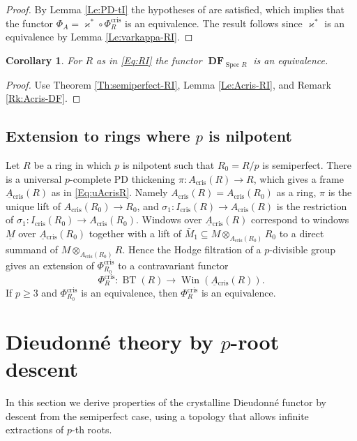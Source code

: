 \documentclass[a4paper,11pt]{article}
\theoremstyle{plain}
\newtheorem{Cor}[Lemma]{Corollary}
\theoremstyle{definition}
\theoremstyle{remark}
\theoremstyle{definition}
\numberwithin{Lemma}{section}
\numberwithin{Subpoint}{Lemma}
\numberwithin{equation}{section}
\newcommand{\DD}{{\mathbb{D}}}
\newcommand{\FF}{{\mathbb{F}}}
\DeclareMathOperator{\BT}{BT}
\DeclareMathOperator{\DFfun}{\mathbf{DF}} %
\DeclareMathOperator{\Spec}{Spec}
\DeclareMathOperator{\Win}{Win}
\DeclareMathOperator{\cris}{cris}
\renewcommand{\u}{\underline}
\newcommand{\chang}[1]{{#1}}
\begin{document}
\begin{proof}
By Lemma \ref{Le:PD-tI} the hypotheses of \cite[Th.~5.7]{Lau:Semiperfect}
are satisfied, which implies that the functor 
$\Phi_A=\varkappa^*\circ\Phi_R^{\cris}$ is an equivalence.
The result follows since $\varkappa^*$ is an equivalence by
Lemma \ref{Le:varkappa-RI}.
\end{proof}

\begin{Cor}
\label{Co:semiperfect-RI}
For $R$ as in \eqref{Eq:RI} the functor
$
\DFfun_{\Spec R}
$
is an equivalence.
\end{Cor}

\begin{proof}
\chang{Use Theorem \ref{Th:semiperfect-RI}, Lemma \ref{Le:Acris-RI}, and Remark \ref{Rk:Acris-DF}.}
\end{proof}

\subsection{Extension to rings where $p$ is nilpotent}

Let $R$ be a ring in which $p$ is nilpotent such that $R_0=R/p$ is semiperfect.
There is a universal \chang{$p$-complete} PD thickening $\pi:A_{\cris}(R)\to R$,
which gives a frame $\u A{}_{\cris}(R)$ as in \eqref{Eq:uAcrisR}.
Namely $A_{\cris}(R)=A_{\cris}(R_0)$ as a ring, 
$\pi$ is the unique lift of $A_{\cris}(R_0)\to R_0$,
and $\sigma_1:I_{\cris}(R)\to A_{\cris}(R)$ 
is the restriction of $\sigma_1:I_{\cris}(R_0)\to A_{\cris}(R_0)$.
Windows over $\u A{}_{\cris}(R)$ correspond to windows $\u M$ 
over $\u A{}_{\cris}(R_0)$ together with a lift of 
$\bar M_1\subseteq M\otimes_{A_{\cris}(R_0)}R_0$
to a direct summand of $M\otimes_{A_{\cris}(R_0)}R$.
Hence the Hodge filtration of a $p$-divisible group gives
an extension of $\Phi_{R_0}^{\cris}$ to a contravariant functor
\begin{equation}
\label{Eq:PhiRcris-gen}
\Phi_R^{\cris}:\BT(R)\to\Win(\u A{}_{\cris}(R)).
\end{equation}
If $p\ge 3$ and $\Phi_{R_0}^{\cris}$ is an equivalence,
then $\Phi_R^{\cris}$ is an equivalence.

\section{Dieudonn\'e theory by $p$-root descent}
\label{Se:descent}

In this section we derive properties of the crystalline Dieudonn\'e
functor by descent from the semiperfect case, using a topology that
allows infinite extractions of $p$-th roots.
\end{document}
